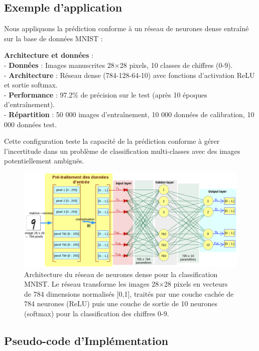 \documentclass[a4paper,12pt]{article}
\begin{document}
\subsection{Exemple d'application}

Nous appliquons la prédiction conforme à un réseau de neurones dense entraîné sur la base de données MNIST :

\textbf{Architecture et données} : \\
- \textbf{Données} : Images manuscrites 28×28 pixels, 10 classes de chiffres (0-9). \\
- \textbf{Architecture} : Réseau dense (784-128-64-10) avec fonctions d'activation ReLU et sortie softmax. \\
- \textbf{Performance} : 97.2\% de précision sur le test (après 10 époques d'entraînement).\\
- \textbf{Répartition} : 50 000 images d'entraînement, 10 000 données de calibration, 10 000 données test.

Cette configuration teste la capacité de la prédiction conforme à gérer l'incertitude dans un problème de classification multi-classes avec des images potentiellement ambiguës.

\begin{figure}
    \centering
    \includegraphics[width=1\linewidth]{archiReseau.png}
    \caption{Architecture du réseau de neurones dense pour la classification MNIST. Le réseau transforme les images 28×28 pixels en vecteurs de 784 dimensions normalisés [0,1], traités par une couche cachée de 784 neurones (ReLU) puis une couche de sortie de 10 neurones (softmax) pour la classification des chiffres 0-9.}
    \label{fig:enter-label}
\end{figure}

\subsection{Pseudo-code d'Implémentation}
\end{document}

